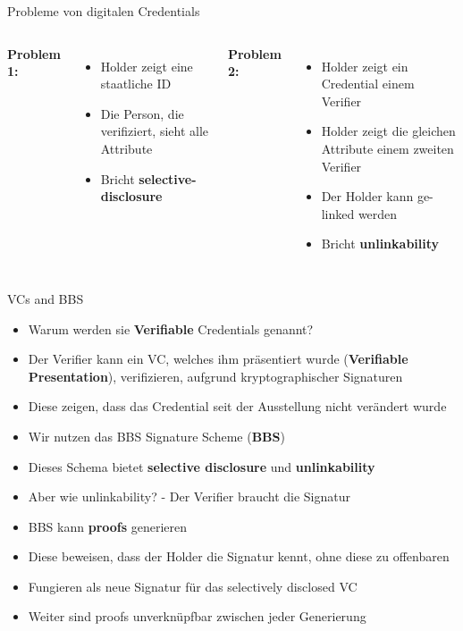 \documentclass[
	german,%
	authorontitle=true,
	]{bfhbeamer}
\begin{document}
\begin{frame}{Probleme von digitalen Credentials}
    \begin{columns}[onlytextwidth,T]
        \column{70mm}  
        \textbf{Problem 1:}
        \begin{itemize}
            \item Holder zeigt eine staatliche ID
            \item Die Person, die verifiziert, sieht alle Attribute
            \item Bricht \textbf{selective-disclosure}
        \end{itemize}

        \column{70mm}  
        \textbf{Problem 2:}
        \begin{itemize}
            \item Holder zeigt ein Credential einem Verifier
            \item Holder zeigt die gleichen Attribute einem zweiten Verifier
            \item Der Holder kann ge-linked werden
            \item Bricht \textbf{unlinkability}
        \end{itemize}

    \end{columns}
\end{frame}


\begin{frame}{VCs and BBS}
    \begin{itemize}
        \item Warum werden sie \textbf{Verifiable} Credentials genannt?
        \item Der Verifier kann ein VC, welches ihm präsentiert wurde (\textbf{Verifiable Presentation}), verifizieren, aufgrund kryptographischer Signaturen
        \item Diese zeigen, dass das Credential seit der Ausstellung nicht verändert wurde
        \item Wir nutzen das BBS Signature Scheme (\textbf{BBS}) 
        \item Dieses Schema bietet \textbf{selective disclosure} und \textbf{unlinkability}
        \item Aber wie unlinkability? - Der Verifier braucht die Signatur
        \item BBS kann \textbf{proofs} generieren
        \item Diese beweisen, dass der Holder die Signatur kennt, ohne diese zu offenbaren
        \item Fungieren als neue Signatur für das selectively disclosed VC
        \item Weiter sind proofs unverknüpfbar zwischen jeder Generierung
    \end{itemize}
\end{frame}
\end{document}
